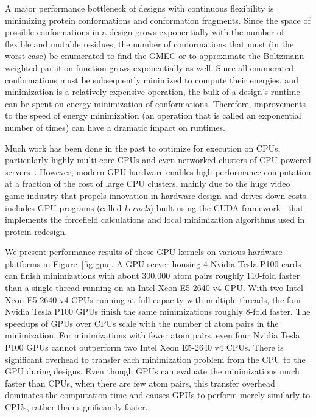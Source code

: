 
A major performance bottleneck of \osprey designs with continuous flexibility is minimizing protein conformations and conformation fragments. Since the space of possible conformations in a design grows exponentially with the number of flexible and mutable residues, the number of conformations that must (in the worst-case) be enumerated to find the GMEC or to approximate the Boltzmann-weighted partition function grows exponentially as well. Since all enumerated conformations must be subsequently minimized to compute their energies, and minimization is a relatively expensive operation, the bulk of a design's runtime can be spent on energy minimization of conformations. Therefore, improvements to the speed of energy minimization (an operation that is called an exponential number of times) can have a dramatic impact on \osprey runtimes.

Much work has been done in the past to optimize \osprey for execution on CPUs, particularly highly multi-core CPUs and even networked clusters of CPU-powered servers~\cite{minBounds_DACS,cloud_OSPREY}. However, modern GPU hardware enables high-performance computation at a fraction of the cost of large CPU clusters, mainly due to the huge video game industry that propels innovation in hardware design and drives down costs.  includes GPU programs (called {\it kernels}) built using the CUDA framework~\cite{nvidia2010programming} that implements the forcefield calculations and local minimization algorithms used in protein redesign.

We present performance results of these GPU kernels on various hardware platforms in Figure~\ref{fig:gpu}. A GPU server housing 4 Nvidia Tesla P100 cards can finish minimizations with about 300,000 atom pairs roughly 110-fold faster than a single thread running on an Intel Xeon E5-2640 v4 CPU. With two Intel Xeon E5-2640 v4 CPUs running at full capacity with multiple threads, the four Nvidia Tesla P100 GPUs finish the same minimizations roughly 8-fold faster. The speedups of GPUs over CPUs scale with the number of atom pairs in the minimization. For minimizations with fewer atom pairs, even four Nvidia Tesla P100 GPUs cannot outperform two Intel Xeon E5-2640 v4 CPUs. There is significant overhead to transfer each minimization problem from the CPU to the GPU during designs. Even though GPUs can evaluate the minimizations much faster than CPUs, when there are few atom pairs, this transfer overhead dominates the computation time and causes GPUs to perform merely similarly to CPUs, rather than significantly faster.

